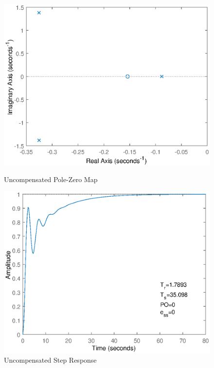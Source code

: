 \documentclass{article}
\begin{document}
    \begin{figure}[ht]
        \begin{minipage}[t]{.5\textwidth}
            \includegraphics[scale=.5]{UncompensatedPoles.eps}
            \caption{Uncompensated Pole-Zero Map}
        \end{minipage}%
        \begin{minipage}[t]{.5\textwidth}
            \includegraphics[scale=.5]{UncompensatedResponse.eps}
            \caption{Uncompensated Step Response}
            \label{fig:UnResp}
        \end{minipage}
    \end{figure}
\end{document}
